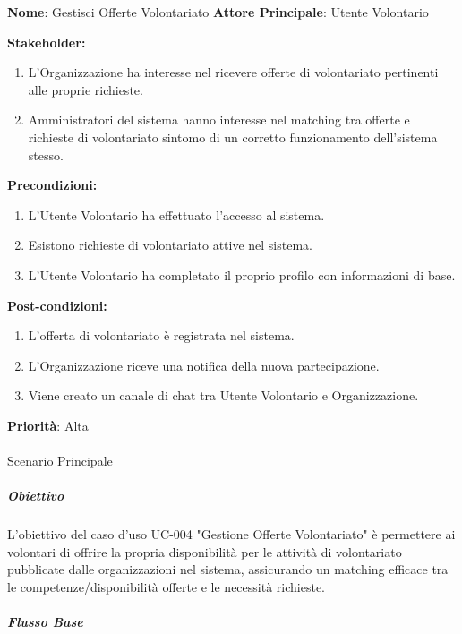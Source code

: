 \textbf{Nome}: Gestisci Offerte Volontariato 
\textbf{Attore Principale}: Utente Volontario

\textbf{Stakeholder:}

\begin{enumerate}
    \item L’Organizzazione ha interesse nel ricevere offerte di volontariato pertinenti alle proprie richieste.
    \item Amministratori del sistema hanno interesse nel matching tra offerte e richieste di volontariato sintomo di un corretto funzionamento dell’sistema stesso.
\end{enumerate}

\textbf{Precondizioni:}

\begin{enumerate}
    \item L'Utente Volontario ha effettuato l'accesso al sistema.
    \item Esistono richieste di volontariato attive nel sistema.
    \item L'Utente Volontario ha completato il proprio profilo con informazioni di base.
\end{enumerate}

\textbf{Post-condizioni:}

\begin{enumerate}
    \item L'offerta di volontariato è registrata nel sistema.
    \item L'Organizzazione riceve una notifica della nuova partecipazione.
    \item Viene creato un canale di chat tra Utente Volontario e Organizzazione.
\end{enumerate}

\textbf{Priorità}: Alta

\paragraph{}{Scenario Principale}

\subparagraph*{Obiettivo}
L'obiettivo del caso d'uso UC-004 "Gestione Offerte Volontariato" è permettere ai volontari di offrire la propria disponibilità per le attività di volontariato pubblicate dalle organizzazioni nel sistema, assicurando un matching efficace tra le competenze/disponibilità offerte e le necessità richieste.

\subparagraph*{Flusso Base}

